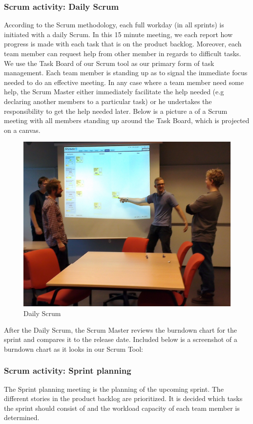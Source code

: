 \subsubsection{Scrum activity: Daily Scrum}
According to the Scrum methodology, each full workday (in all sprints) is initiated with a daily Scrum. In this 15 minute meeting, we each report how progress is made with each task that is on the product backlog. Moreover, each team member can request help from other member in regards to difficult tasks. We use the Task Board of our Scrum tool\cite{scrumwise} as our primary form of task management. Each team member is standing up as to signal the immediate focus needed to do an effective meeting. In any case where a team member need some help, the Scrum Master either immediately facilitate the help needed (e.g declaring another members to a particular task) or he undertakes the responsibility to get the help needed later. Below is a picture a of a Scrum meeting with all members standing up around the Task Board, which is projected on a canvas.
\begin{figure}[H]
  \includegraphics[width=\textwidth,natwidth=1696,natheight=1349]{illustrations/Daily.jpg}
  \caption{Daily Scrum}
  \label{dailyscrum}
\end{figure}
After the Daily Scrum, the Scrum Master reviews the burndown chart for the sprint and compares it to the release date. Included below is a screenshot of a burndown chart as it looks in our Scrum Tool:
\subsubsection{Scrum activity: Sprint planning}
The Sprint planning meeting is the planning of the upcoming sprint. The different stories in the product backlog are prioritized. It is decided which tasks the sprint should consist of and the workload capacity of each team member is determined.

